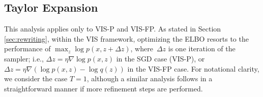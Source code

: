 \subsection{Taylor Expansion}\label{sec:taylor}

This analysis applies only to VIS-P and VIS-FP.
As stated in Section \ref{sec:rewriting},  within the VIS framework, optimizing the ELBO resorts to the performance of $\max_z \log p(x, z + \Delta z)$, where~$\Delta z$ is one iteration of the sampler; i.e., $\Delta z = \eta \nabla \log p(x, z)$ in the SGD case (VIS-P), \linebreak or  $\Delta z = \eta \nabla (\log p(x, z) - \log q(z))$ in the VIS-FP case. %
For notational clarity, we consider the case $T=1$, 
although a similar analysis
follows in a straightforward manner if more refinement steps are performed.

